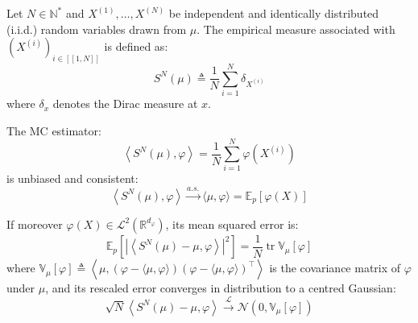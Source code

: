 \begin{definition}\label{th:empirical_measure}
	Let $N\in\mathbb{N}^*$ and $X^{(1)},\dots,X^{(N)}$ be independent and identically distributed (i.i.d.) random variables drawn from $\mu$. The empirical measure associated with $\left(X^{(i)}\right)_{i\in[\![1,N]\!]}$ is defined as:
	\begin{equation}
		S^N(\mu)\triangleq\frac{1}{N}\sum_{i=1}^N\delta_{X^{(i)}}
	\end{equation}
	where $\delta_x$ denotes the Dirac measure at $x$.
\end{definition}

\begin{proposition}\label{th:MC_estimator}
	The MC estimator:
	\begin{equation}
		\left\langle S^N(\mu),\varphi\right\rangle=\frac{1}N\sum_{i=1}^N\varphi\left(X^{(i)}\right)
	\end{equation}
	is unbiased and consistent:
	\begin{equation}
		\left\langle S^N(\mu),\varphi\right\rangle\overset{a.s.}{\longrightarrow}\langle\mu,\varphi\rangle=\mathbb{E}_p[\varphi(X)]
	\end{equation}

	If moreover $\varphi(X)\in\mathcal{L}^2(\mathbb{R}^{d_{\varphi}})$, its mean squared error is:
	\begin{equation}
		\mathbb{E}_p\left[\left|\left\langle S^N(\mu)-\mu,\varphi\right\rangle\right|^2\right]=\frac{1}{N}\operatorname{tr}\mathbb{V}_\mu[\varphi]
	\end{equation}
	where $\mathbb{V}_\mu[\varphi]\triangleq\left\langle\mu,(\varphi-\langle\mu,\varphi\rangle)(\varphi-\langle\mu,\varphi\rangle)^\top\right\rangle$ is the covariance matrix of $\varphi$ under $\mu$, and its rescaled error converges in distribution to a centred Gaussian:
	\begin{equation}
		\sqrt{N}\left\langle S^N(\mu)-\mu,\varphi\right\rangle\overset{\mathcal{L}}{\longrightarrow}\mathcal{N}(0,\mathbb{V}_\mu[\varphi])
	\end{equation}
\end{proposition}


